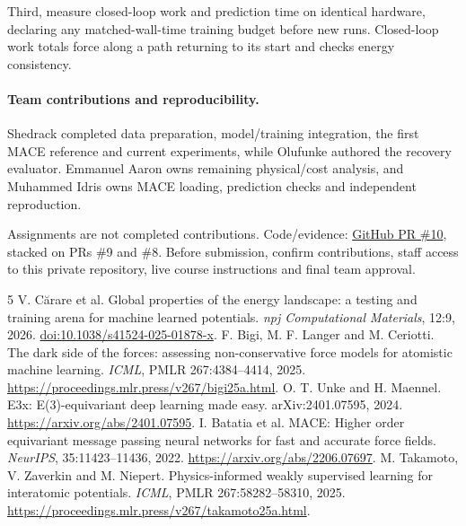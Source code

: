 \documentclass{article}
\begin{document}
Third, measure closed-loop work and prediction time on identical hardware, declaring any matched-wall-time training budget before new runs. Closed-loop work totals force along a path returning to its start and checks energy consistency.
\paragraph{Team contributions and reproducibility.}
Shedrack completed data preparation, model/training integration, the first MACE reference and current experiments, while Olufunke authored the recovery evaluator. Emmanuel Aaron owns remaining physical/cost analysis, and Muhammed Idris owns MACE loading, prediction checks and independent reproduction.

Assignments are not completed contributions. Code/evidence: \href{https://github.com/Shedrackeze002/idl-molecular-force-consistency/pull/10}{GitHub PR \#10}, stacked on PRs \#9 and \#8. Before submission, confirm contributions, staff access to this private repository, live course instructions and final team approval.
\begin{thebibliography}{5}\small
{} V. C\u{a}rare et al. Global properties of the energy landscape: a testing and training arena for machine learned potentials. \emph{npj Computational Materials}, 12:9, 2026. \href{https://doi.org/10.1038/s41524-025-01878-x}{doi:10.1038/s41524-025-01878-x}.
 F. Bigi, M. F. Langer and M. Ceriotti. The dark side of the forces: assessing non-conservative force models for atomistic machine learning. \emph{ICML}, PMLR 267:4384--4414, 2025. \url{https://proceedings.mlr.press/v267/bigi25a.html}.
 O. T. Unke and H. Maennel. E3x: E(3)-equivariant deep learning made easy. arXiv:2401.07595, 2024. \url{https://arxiv.org/abs/2401.07595}.
 I. Batatia et al. MACE: Higher order equivariant message passing neural networks for fast and accurate force fields. \emph{NeurIPS}, 35:11423--11436, 2022. \url{https://arxiv.org/abs/2206.07697}.
 M. Takamoto, V. Zaverkin and M. Niepert. Physics-informed weakly supervised learning for interatomic potentials. \emph{ICML}, PMLR 267:58282--58310, 2025. \url{https://proceedings.mlr.press/v267/takamoto25a.html}.
\end{thebibliography}
\end{document}
